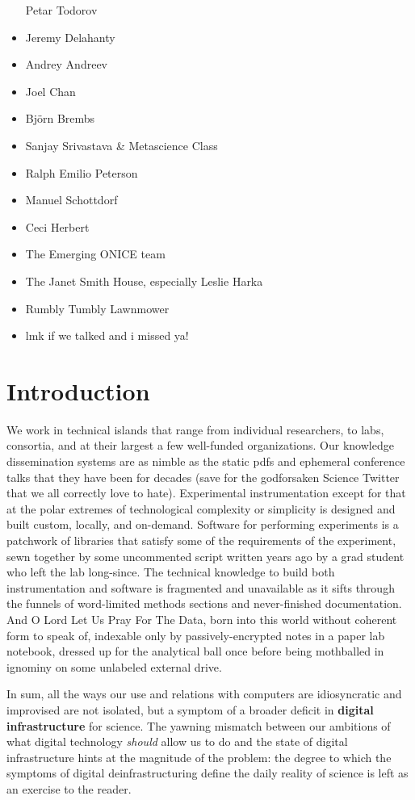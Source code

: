 \documentclass[notoc]{tufte-book}
\begin{document}
\begin{itemize}
  Petar Todorov
\item
  Jeremy Delahanty
\item
  Andrey Andreev
\item
  Joel Chan
\item
  Björn Brembs
\item
  Sanjay Srivastava \& Metascience Class
\item
  Ralph Emilio Peterson
\item
  Manuel Schottdorf
\item
  Ceci Herbert
\item
  The Emerging ONICE team
\item
  The Janet Smith House, especially Leslie Harka
\item
  Rumbly Tumbly Lawnmower
\item
  lmk if we talked and i missed ya!
\end{itemize}


\chapter{Introduction}



 We work in technical islands that range from individual
researchers, to labs, consortia, and at their largest a few well-funded
organizations. Our knowledge dissemination systems are as nimble as the
static pdfs and ephemeral conference talks that they have been for
decades (save for the godforsaken Science Twitter that we all correctly
love to hate). Experimental instrumentation except for that at the polar
extremes of technological complexity or simplicity is designed and built
custom, locally, and on-demand. Software for performing experiments is a
patchwork of libraries that satisfy some of the requirements of the
experiment, sewn together by some uncommented script written years ago
by a grad student who left the lab long-since. The technical knowledge
to build both instrumentation and software is fragmented and unavailable
as it sifts through the funnels of word-limited methods sections and
never-finished documentation. And O Lord Let Us Pray For The Data, born
into this world without coherent form to speak of, indexable only by
passively-encrypted notes in a paper lab notebook, dressed up for the
analytical ball once before being mothballed in ignominy on some
unlabeled external drive.

In sum, all the ways our use and relations with computers are
idiosyncratic and improvised are not isolated, but a symptom of a
broader deficit in \textbf{digital infrastructure} for science. The
yawning mismatch between our ambitions of what digital technology
\emph{should} allow us to do and the state of digital infrastructure
hints at the magnitude of the problem: the degree to which the symptoms
of digital deinfrastructuring define the daily reality of science is
left as an exercise to the reader.
\end{document}
